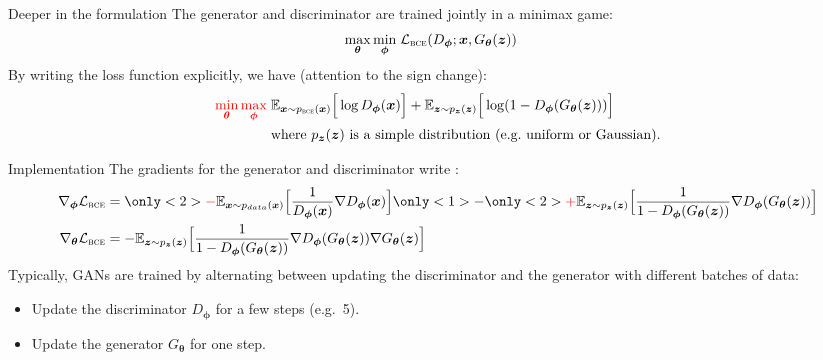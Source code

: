 \documentclass[11pt,aspectratio=169,usenames,dvipsnames]{beamer}
\newcommand{\bs}{\boldsymbol}
\begin{document}
\begin{frame}{Deeper in the formulation}
  The generator and discriminator are trained jointly in a minimax game:
  \begin{align*}
  \max_{\bs{\theta}} \min_{\bs{\phi}} \; & \mathcal{L}_{\textsc{bce}}(D_{\bs{\phi}};\bs{x},G_{\bs{\theta}}(\bs{z}))
 \end{align*}
  By writing the loss function explicitly, we have (attention to the sign change):
 \begin{align*}
  {\color{red}\min_{\bs{\theta}} \max_{\bs{\phi}}} \; &\mathbb{E}_{\bs{x}\sim p_{\textsc{bce}}(\bs{x})}\Big[\log D_{\bs{\phi}}(\bs{x})\Big] + \mathbb{E}_{\bs{z}\sim p_{\bs{z}}(\bs{z })}\Big[\log(1 - D_{\bs{\phi}}(G_{\bs{\theta}}(\bs{z})))\Big]\\
  &\text{where } p_{\bs{z}}(\bs{z}) \text{ is a simple distribution (e.g.\ uniform or Gaussian).}
 \end{align*}
\end{frame}

\begin{frame}{Implementation}
The gradients for the generator and discriminator write :
  \begin{align*}
  \nabla_{\bs{\phi}} \mathcal{L}_{\textsc{bce}} &= \only<2>{{\color{red}-}} \mathbb{E}_{\bs{x}\sim p_{\textsc{}{data}}(\bs{x})}\Big[\frac{1}{D_{\bs{\phi}}(\bs{x})}\nabla D_{\bs{\phi}}(\bs{x})\Big] \only<1>{-}\only<2>{{\color{red}+}} \mathbb{E}_{\bs{z}\sim p_{\bs{z}}(\bs{z })}\Big[\frac{1}{1 - D_{\bs{\phi}}(G_{\bs{\theta}}(\bs{z}))}\nabla D_{\bs{\phi}}(G_{\bs{\theta}}(\bs{z}))\Big]\\
  \nabla_{\bs{\theta}} \mathcal{L}_{\textsc{bce}} &= -\mathbb{E}_{\bs{z}\sim p_{\bs{z}}(\bs{z })}\Big[\frac{1}{1 - D_{\bs{\phi}}(G_{\bs{\theta}}(\bs{z}))}\nabla D_{\bs{\phi}}(G_{\bs{\theta}}(\bs{z}))\nabla G_{\bs{\theta}}(\bs{z})\Big]
 \end{align*}
Typically, GANs are trained by alternating between updating the discriminator and the generator with different batches of data:
\begin{itemize}
 \item Update the discriminator $D_{\bs{\phi}}$ for a few steps (e.g.\ 5).
 \item Update the generator $G_{\bs{\theta}}$ for one step.
\end{itemize}
\end{frame}
\end{document}
